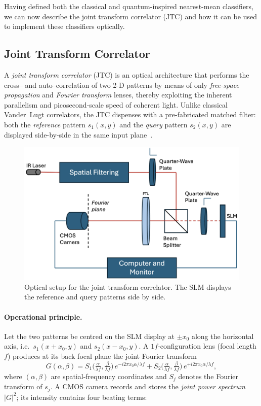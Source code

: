\documentclass[twocolumn]{article} %
\begin{document}
Having defined both the classical and quantum-inspired nearest-mean classifiers, we can now describe the joint transform correlator (JTC) and how it can be used to implement these classifiers optically.

\subsection{Joint Transform Correlator}
\label{subsec:jtc}
A \emph{joint transform correlator} (JTC) is an optical architecture
that performs the cross– and auto–correlation of two 2-D patterns by
means of only \emph{free-space propagation} and \emph{Fourier
transform} lenses, thereby exploiting the inherent parallelism and
picosecond‐scale speed of coherent light.  Unlike classical
Vander~Lugt correlators, the JTC dispenses with a pre-fabricated
matched filter: both the \emph{reference} pattern \(s_{1}(x,y)\) and
the \emph{query} pattern \(s_{2}(x,y)\) are displayed side-by-side in
the same input plane~\cite{Javidi1989}.

\begin{figure}[h]
    \centering
    \includegraphics[width=\linewidth]{figures/setup/setup.png}
    \caption{Optical setup for the joint transform correlator. The SLM displays the reference and query patterns side by side.}
    \label{fig:optical-classifier}
\end{figure}

\paragraph{Operational principle.}
Let the two patterns be centred on the SLM display at \(\pm x_{0}\) along the horizontal
axis, i.e.\ \(s_{1}(x+x_{0},y)\) and \(s_{2}(x-x_{0},y)\).  A
\(1f\)-configuration lens (focal length \(f\)) produces at its back
focal plane the joint Fourier transform
\[
  G(\alpha,\beta)=
    S_{1}\!\bigl(\tfrac{\alpha}{\lambda f},
                 \tfrac{\beta}{\lambda f}\bigr)\,
      e^{-i2\pi x_{0}\alpha/\lambda f}
  + S_{2}\!\bigl(\tfrac{\alpha}{\lambda f},
                 \tfrac{\beta}{\lambda f}\bigr)\,
      e^{+i2\pi x_{0}\alpha/\lambda f},
\]
where \((\alpha,\beta)\) are spatial-frequency coordinates and
\(S_{j}\) denotes the Fourier transform of \(s_{j}\).
A CMOS camera records and stores the \emph{joint power spectrum}
\(|G|^{2}\); its intensity contains four beating terms:
\end{document}
